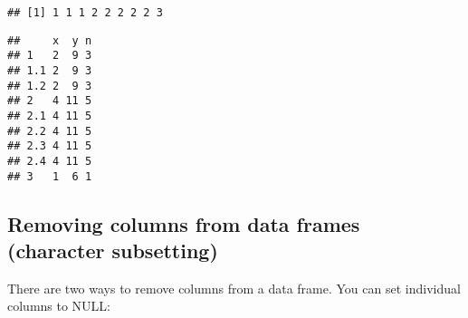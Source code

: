 \begin{Shaded}
\begin{Highlighting}[]
\StringTok{ }\NormalTok{(} \NormalTok{(}\NormalTok{, }\NormalTok{, }\NormalTok{), } \NormalTok{(}\NormalTok{, }\NormalTok{, }\NormalTok{), } \NormalTok{(}\NormalTok{, }\NormalTok{, }\NormalTok{))}
\NormalTok{(}\OperatorTok{:}\OperatorTok{$}
\end{Highlighting}
\end{Shaded}

\begin{verbatim}
## [1] 1 1 1 2 2 2 2 2 3
\end{verbatim}

\begin{Shaded}
\begin{Highlighting}[]
\NormalTok{df[}\NormalTok{(}\OperatorTok{:}\OperatorTok{$}\NormalTok{n), ]}
\end{Highlighting}
\end{Shaded}

\begin{verbatim}
##     x  y n
## 1   2  9 3
## 1.1 2  9 3
## 1.2 2  9 3
## 2   4 11 5
## 2.1 4 11 5
## 2.2 4 11 5
## 2.3 4 11 5
## 2.4 4 11 5
## 3   1  6 1
\end{verbatim}

\hypertarget{removing-columns-from-data-frames-character-subsetting}{%
\subsection{Removing columns from data frames (character
subsetting)}\label{removing-columns-from-data-frames-character-subsetting}}

There are two ways to remove columns from a data frame. You can set
individual columns to NULL: 

\begin{Shaded}
\begin{Highlighting}[]
\StringTok{ }\NormalTok{(} \OperatorTok{:}\NormalTok{, } \OperatorTok{:}\NormalTok{, }\NormalTok{ letters[}\OperatorTok{:}\NormalTok{])}
\OperatorTok{$}\StringTok{ }
\end{Highlighting}
\end{Shaded}

